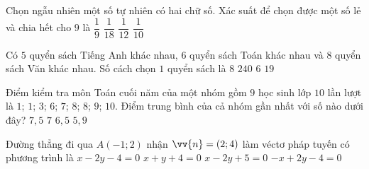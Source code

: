 \begin{ex}%
	Chọn ngẫu nhiên một số tự nhiên có hai chữ số. Xác suất để chọn được một số lẻ và chia hết cho $9$ là
	\choice
	{$\dfrac{1}{9}$}
	{\True $\dfrac{1}{18}$}
	{$\dfrac{1}{12}$}
	{$\dfrac{1}{10}$}
\end{ex}
\begin{ex}%
	Có $5$ quyển sách Tiếng Anh khác nhau, $6$ quyển sách Toán khác nhau và $8$ quyển sách Văn khác nhau. Số cách chọn $1$ quyển sách là
	\choice
	{$8$}
	{$240$}
	{$6$}
	{\True $19$}
\end{ex}
\begin{ex}%
	Điểm kiểm tra môn Toán cuối năm của một nhóm gồm $9$ học sinh lớp $10$ lần lượt là $1$; $1$; $3$; $6$; $7$; $8$; $8$; $9$; $10$. Điểm trung bình của cả nhóm gần nhất với số nào dưới đây?
	\choice
	{$7{,}5$}
	{$7$}
	{$6{,}5$}
	{\True $5{,}9$}
\end{ex}
\begin{ex}%
	Đường thẳng đi qua $A(-1;2)$ nhận $\vv{n}=(2;4)$ làm véctơ pháp tuyến có phương trình là
	\choice
	{$x-2y-4=0$}
	{$x+y+4=0$}
	{\True $x-2y+5=0$}
	{$-x+2y-4=0$}
\end{ex}
